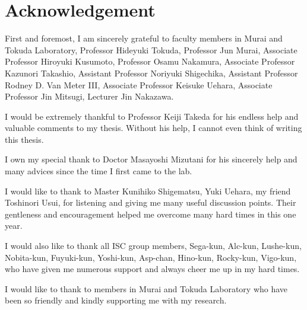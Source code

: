 \section*{Acknowledgement}

First and foremost, I am sincerely grateful to faculty members in Murai and Tokuda Laboratory, Professor Hideyuki Tokuda, Professor Jun Murai, Associate Professor Hiroyuki Kusumoto, Professor Osamu Nakamura, Associate Professor Kazunori Takashio, Assistant Professor Noriyuki Shigechika, Assistant Professor Rodney D. Van Meter III, Associate Professor Keisuke Uehara, Associate Professor Jin Mitsugi, Lecturer Jin Nakazawa.

I would be extremely thankful to Professor Keiji Takeda for his endless help and valuable comments to my thesis. Without his help, I cannot even think of writing this thesis.

I own my special thank to Doctor Masayoshi Mizutani for his sincerely help and many advices since the time I first came to the lab.

I would like to thank to Master Kunihiko Shigematsu, Yuki Uehara, my friend Toshinori Usui, for listening	and giving me many useful discussion points. Their gentleness and encouragement helped me overcome many hard times in this one year. 
 
I would also like to thank all ISC group members, Sega-kun, Alc-kun, Lushe-kun, Nobita-kun, Fuyuki-kun, Yoshi-kun, Asp-chan, Hino-kun, Rocky-kun, Vigo-kun, who have given me numerous support and always cheer me up in my hard times. 

I would like to thank to members in Murai and Tokuda Laboratory who have been so friendly and kindly supporting me with my research.

